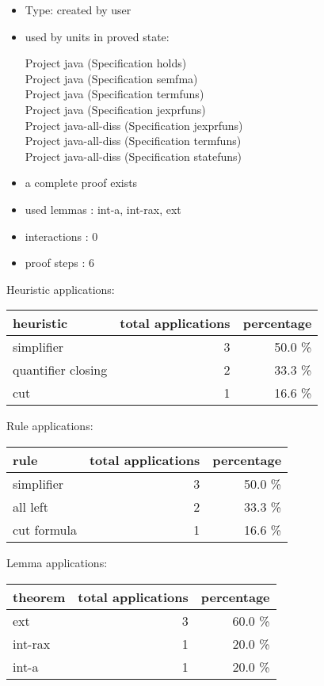 \documentclass[a4paper]{article}
\begin{document}
\begin{itemize}

\item Type: created by user

\item used by units in proved state:

Project java (Specification holds) \\
Project java (Specification semfma) \\
Project java (Specification termfuns) \\
Project java (Specification jexprfuns) \\
Project java-all-diss (Specification jexprfuns) \\
Project java-all-diss (Specification termfuns) \\
Project java-all-diss (Specification statefuns)
\item       a complete proof exists
\item       used lemmas  : int-a, int-rax, ext
\item       interactions : 0
\item       proof steps  : 6
\end{itemize}

\medskip


Heuristic applications:

\begin{supertabular}{l|r|r}
heuristic	& total applications & percentage \\ \hline
simplifier & 3 & 50.0 \% \\
quantifier closing & 2 & 33.3 \% \\
cut & 1 & 16.6 \% \\

\end{supertabular}

Rule applications:

\begin{supertabular}{l|r|r}
rule	        & total applications & percentage \\ \hline
simplifier & 3 & 50.0 \% \\
all left & 2 & 33.3 \% \\
cut formula & 1 & 16.6 \% \\

\end{supertabular}

Lemma applications:

\begin{supertabular}{l|r|r}
theorem	        & total applications & percentage \\ \hline
ext & 3 & 60.0 \% \\
int-rax & 1 & 20.0 \% \\
int-a & 1 & 20.0 \% \\

\end{supertabular}
\pagebreak
\end{document}

